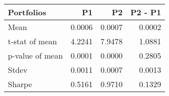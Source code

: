 \begin{tabular}{lrrr}
\toprule
Portfolios & P1 & P2 & P2 - P1 \\
\midrule
Mean & 0.0006 & 0.0007 & 0.0002 \\
t-stat of mean & 4.2241 & 7.9478 & 1.0881 \\
p-value of mean & 0.0001 & 0.0000 & 0.2805 \\
Stdev & 0.0011 & 0.0007 & 0.0013 \\
Sharpe & 0.5161 & 0.9710 & 0.1329 \\
\bottomrule
\end{tabular}
